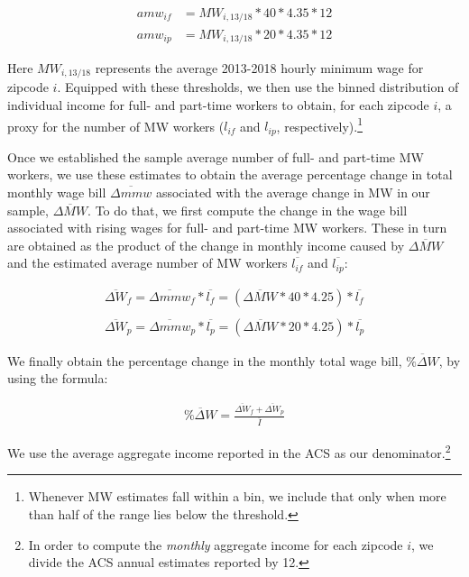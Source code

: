 \begin{align}
	amw_{if} &= MW_{i, 13/18} * 40 * 4.35 * 12 \\
	amw_{ip} &= MW_{i, 13/18} * 20 * 4.35 * 12
\end{align}

Here $MW_{i, 13/18}$ represents the average 2013-2018 hourly minimum wage for 
zipcode $i$. Equipped with these thresholds, we then use the binned distribution of individual income for 
full- and part-time workers to obtain, for each zipcode $i$, a proxy for the number of MW workers 
($l_{if}$ and $l_{ip}$, respectively).\footnote{Whenever MW estimates fall within a bin, we include 
	that only when more than half of the range lies below the threshold.} 

Once we established the sample average number of full- and part-time MW workers, we use 
these estimates to obtain the average percentage change in total monthly wage bill $\overline{\Delta mmw}$ 
associated with the average change in MW in our sample, $\overline{\Delta MW}$. To do that, we first 
compute the change in the wage bill associated with rising wages for full- and part-time MW workers. 
These in turn are obtained as the product of the change in monthly income caused by $\overline{\Delta MW}$ 
and the estimated average number of MW workers $\overline{l_{if}}$ and $\overline{l_{ip}}$: 

\begin{align}
	\overline{\Delta W}_{f} = \overline{\Delta mmw}_{f} * \overline{l_{f}} = (\overline{\Delta MW} * 40 * 4.25) * \overline{l_{f}} \\ 
	\nonumber \\
	\overline{\Delta W}_{p} = \overline{\Delta mmw}_{p} * \overline{l_{p}} = (\overline{\Delta MW} * 20 * 4.25) * \overline{l_{p}}
\end{align}


We finally obtain the percentage change in the monthly total wage  bill, $\overline{\% \Delta W}$, 
by using the formula: 

\begin{align}\label{eq:benchmark_Dwage_pct}
	\overline{\% \Delta W} = \frac{\overline{\Delta W}_{f} + \overline{\Delta W}_{p}}{\overline{I}}
\end{align}

We use the average aggregate income reported in the ACS as our denominator.\footnote{In 
	order to compute the \textit{monthly} aggregate income for each zipcode $i$, we divide 
	the ACS annual estimates reported by 12.}


